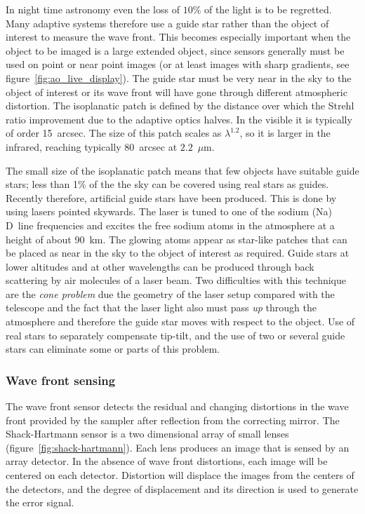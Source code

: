 In night time astronomy even the loss of $10\%$ of the light is to be 
regretted. Many adaptive systems therefore use a guide star rather than the
object of interest to measure the wave front. This becomes especially important
when the object to be imaged is a large extended object, since sensors 
generally must be used on point or near point images (or at least images with
sharp gradients, see figure~\ref{fig:ao_live_display}). The guide star
must be very near in the sky to the object of interest or its wave front will
have gone through different atmospheric distortion. The isoplanatic patch
is defined by the distance over which the Strehl ratio improvement due to
the adaptive optics halves. In the visible it is typically of order
15~arcsec. The size of this patch scales as $\lambda^{1.2}$, so it is larger
in the infrared, reaching typically 80~arcsec at $2.2$~$\mu$m.

The small size of the isoplanatic patch means that few objects have suitable
guide stars; less than 1\% of the the sky can be covered using real stars
as guides. Recently therefore, artificial guide stars have been produced. 
This is done by using lasers pointed skywards. The laser is tuned to one of 
the sodium (Na) D~line frequencies and excites the free sodium atoms in the
atmosphere at a height of about 90~km. The glowing atoms appear as star-like
patches that can be placed as near in the sky to the object of interest as
required. Guide stars at lower altitudes and at other wavelengths can be 
produced through back scattering by air molecules of a laser beam. 
Two difficulties with this technique are the {\it cone problem} due the
geometry of the laser setup compared with the telescope and the fact that
the laser light also must pass {\it up} through the atmosphere and therefore
the guide star moves with respect to the object. Use of real stars to separately
compensate tip-tilt, and the use of two or several guide stars can eliminate
some or parts of this problem.

\subsubsection{Wave front sensing}
The wave front sensor detects the residual and 
changing distortions in the wave front provided by the sampler after 
reflection from the correcting mirror. The Shack-Hartmann sensor is a two
dimensional array of small lenses (figure~\ref{fig:shack-hartmann}). Each
lens produces an image that is sensed by an array detector. In the absence
of wave front distortions, each image will be centered on each detector.
Distortion will displace the images from the centers of the detectors, and
the degree of displacement and its direction is used to generate the error
signal. 

